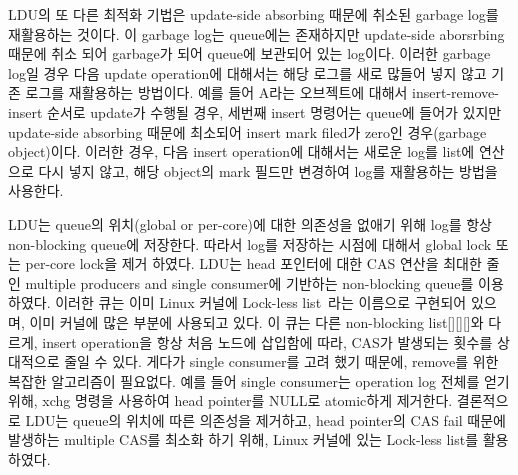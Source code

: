
\ifkor
LDU의 또 다른 최적화 기법은 update-side absorbing 때문에 취소된 garbage log를 재활용하는 것이다.
이 garbage log는 queue에는 존재하지만 update-side aborsrbing 때문에 취소 되어 garbage가 되어 queue에
보관되어 있는 log이다. 
이러한 garbage log일 경우 다음 update operation에 대해서는 해당 로그를 새로 많들어 넣지 않고 기존 로그를 재활용하는
방법이다.
예를 들어 A라는 오브젝트에 대해서 insert-remove-insert 순서로 update가 수행될 경우, 세번째 insert 명령어는
queue에 들어가 있지만 update-side absorbing 때문에 최소되어 insert mark filed가 zero인
경우(garbage object)이다.
이러한 경우, 다음 insert operation에 대해서는 새로운 log를 list에 연산으로 다시 넣지 않고, 해당 object의 mark
필드만 변경하여 log를 재활용하는 방법을 사용한다.
\else
\fi



\ifkor
LDU는 queue의 위치(global or per-core)에 대한 의존성을 없애기 위해 log를 항상 non-blocking queue에
저장한다.
따라서 log를 저장하는 시점에 대해서 global lock 또는 per-core lock을 제거 하였다.
LDU는 head 포인터에 대한 CAS 연산을 최대한 줄인 multiple producers and single
consumer에 기반하는 non-blocking queue를 이용하였다.
이러한 큐는 이미 Linux 커널에 Lock-less list~\cite{HuangLocklessList}라는 이름으로 구현되어 있으며, 이미
커널에 많은 부분에 사용되고 있다.
이 큐는 다른 non-blocking list[][][]와 다르게, insert operation을 항상 처음 노드에 삽입함에
따라, CAS가 발생되는 횟수를 상대적으로 줄일 수 있다.
게다가 single consumer를 고려 했기 때문에, remove를 위한 복잡한 알고리즘이 필요없다. 
예를 들어 single consumer는 operation log 전체를 얻기 위해, xchg 명령을 사용하여 head pointer를
NULL로 atomic하게 제거한다. 
결론적으로 LDU는 queue의 위치에 따른 의존성을 제거하고, head pointer의
CAS fail 때문에 발생하는 multiple CAS를 최소화 하기 위해, Linux 커널에 있는 Lock-less list를 활용 하였다.
\else
\fi


